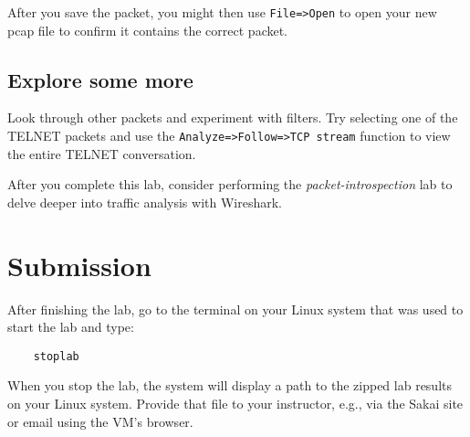 After you save the packet, you might then use {\tt File=>Open} to open your new pcap file to confirm it contains the correct packet.

\subsection{Explore some more}
Look through other packets and experiment with filters.  Try selecting one of the TELNET packets and use the
{\tt Analyze=>Follow=>TCP stream} function to view the entire TELNET conversation.

After you complete this lab, consider performing the \textit{packet-introspection} lab to delve deeper into traffic analysis
with Wireshark.

\section{Submission}
After finishing the lab, go to the terminal on your Linux system that was used to start the lab and type:
\begin{verbatim}
    stoplab 
\end{verbatim}
When you stop the lab, the system will display a path to the zipped lab results on your Linux system.  Provide that file to 
your instructor, e.g., via the Sakai site or email using the VM's browser.

\copyrightnotice


